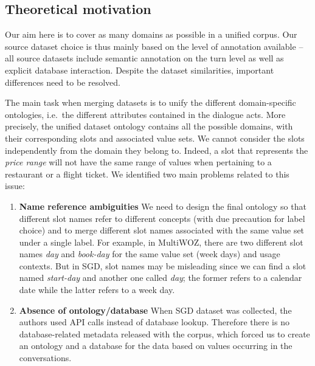 \subsection{Theoretical motivation}
Our aim here is to cover as many domains as possible in a unified corpus.
Our source dataset choice is thus mainly based on the level of annotation available -- all source datasets include semantic annotation on the turn level as well as explicit database interaction. 
Despite the dataset similarities, important differences need to be resolved.

The main task when merging datasets is to unify the different domain-specific ontologies, i.e.\ the different attributes contained in the dialogue acts.
More precisely, the unified dataset ontology contains all the possible domains, with their corresponding slots and associated value sets. We cannot consider the slots independently from the domain they belong to. Indeed, a slot that represents the \textit{price range} will not have the same range of values when pertaining to a restaurant or a flight ticket. We identified two main problems related to this issue:
\begin{enumerate}
    \item \textbf{Name reference ambiguities}
    We need to design the final ontology so that different slot names refer to different concepts (with due precaution for label choice) and to merge different slot names associated with the same value set under a single label.
    For example, in MultiWOZ, there are two different slot names \textit{day} and \textit{book-day} for the same value set (week days) and usage contexts. But in SGD, slot names may be misleading since we can find a slot named \textit{start-day} and another one called \textit{day}; the former refers to a calendar date while the latter refers to a week day.
    
    \item \textbf{Absence of ontology/database} When SGD dataset was collected, the authors used API calls instead of database lookup. Therefore there is no database-related metadata released with the corpus, which forced us to create an ontology and a database for the data based on values occurring in the conversations.
\end{enumerate}

